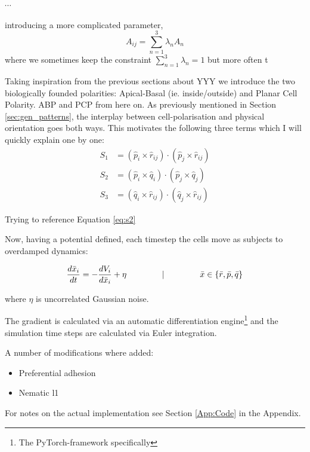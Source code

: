 $\cdots$


 introducing a more complicated parameter, 
\begin{equation}
    A_{ij}=\sum_{n=1}^{3}\lambda_n A_n
\end{equation}
where we sometimes keep the constraint $\sum_{n=1}^{3}\lambda_n=1$ but more often t


Taking inspiration from the previous sections about YYY we introduce the two biologically founded polarities: Apical-Basal (ie. inside/outside) and Planar Cell Polarity. ABP and PCP from here on. As previously mentioned in Section \ref{sec:gen_patterns}, the interplay between cell-polarisation and physical orientation goes both ways. This motivates the following three terms which I will quickly explain one by one:
\begin{subequations}
\begin{align}
S_1&=\left(\hat{p}_i \times \hat{r}_{i j}\right) \cdot\left(\hat{p}_j \times \hat{r}_{i j}\right)\label{eq:s1}\\
S_2&=\left(\hat{p}_i \times \hat{q}_{i}\right) \cdot\left(\hat{p}_j \times \hat{q}_{j}\right)\label{eq:s2}\\
S_3&=\left(\hat{q}_i \times \hat{r}_{i j}\right) \cdot\left(\hat{q}_j \times \hat{r}_{i j}\right)\label{eq:s3}
\end{align}
\end{subequations}



Trying to reference Equation \ref{eq:s2}

Now, having a potential defined, each timestep the cells move as subjects to overdamped dynamics:

\begin{equation}
    \frac{d \bar{x}_i}{d t}=-\frac{d V_i}{d \bar{x}_i}+\eta \hspace{1.5cm}|\hspace{1.5cm}  \bar{x} \in \{\bar{r}, \bar{p}, \bar{q}\}
\end{equation}

where $\eta$ is uncorrelated Gaussian noise.

The gradient is calculated via an automatic differentiation engine\footnote{The PyTorch-framework specifically} and the simulation time steps are calculated via Euler integration.


A number of modifications where added:
\begin{itemize}
    \item Preferential adhesion
    \item Nematic l1
    
\end{itemize}


For notes on the actual implementation see Section \ref{App:Code} in the Appendix.